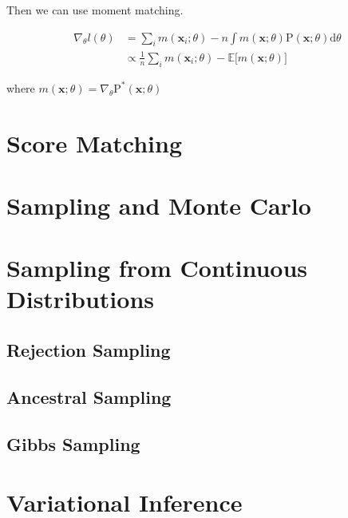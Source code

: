 \documentclass{article}
\newcommand{\prob}{\text{P}}
\renewcommand{\vec}[1]{\mathbf{#1}}
\newcommand{\bx}{\vec{x}}
\begin{document}
Then we can use moment matching.

\begin{align*}
    \nabla_\theta l(\theta) &=  \sum_i m(\bx_i; \theta) - n \int m(\bx; \theta) \prob(\bx; \theta) \text{d} \theta \\
    &\propto \frac{1}{n} \sum_i m(\bx_i; \theta) - \mathbb{E} \big[ m(\bx; \theta) \big]
\end{align*}

where $m(\bx; \theta) = \nabla_\theta \prob^*(\bx; \theta)$

\section{Score Matching}
\section{Sampling and Monte Carlo}

\section{Sampling from Continuous Distributions}
\subsection{Rejection Sampling}
\subsection{Ancestral Sampling}
\subsection{Gibbs Sampling}

\section{Variational Inference}


\end{document}

